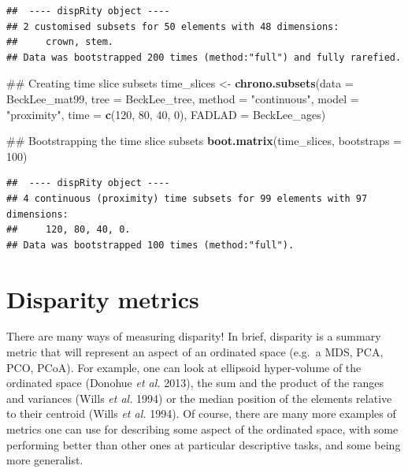 \documentclass[]{book}
\newenvironment{Shaded}{\begin{snugshade}}{\end{snugshade}}
\newcommand{\KeywordTok}[1]{\textcolor[rgb]{0.13,0.29,0.53}{\textbf{#1}}}
\newcommand{\DataTypeTok}[1]{\textcolor[rgb]{0.13,0.29,0.53}{#1}}
\newcommand{\DecValTok}[1]{\textcolor[rgb]{0.00,0.00,0.81}{#1}}
\newcommand{\StringTok}[1]{\textcolor[rgb]{0.31,0.60,0.02}{#1}}
\newcommand{\NormalTok}[1]{#1}
\theoremstyle{definition}
\theoremstyle{definition}
\theoremstyle{remark}
\begin{document}
\begin{verbatim}
##  ---- dispRity object ---- 
## 2 customised subsets for 50 elements with 48 dimensions:
##     crown, stem.
## Data was bootstrapped 200 times (method:"full") and fully rarefied.
\end{verbatim}

\begin{Shaded}
\begin{Highlighting}[]
\NormalTok{## Creating time slice subsets}
\NormalTok{time_slices <-}\StringTok{ }\KeywordTok{chrono.subsets}\NormalTok{(}\DataTypeTok{data =}\NormalTok{ BeckLee_mat99, }\DataTypeTok{tree =}\NormalTok{ BeckLee_tree, }
                               \DataTypeTok{method =} \StringTok{"continuous"}\NormalTok{, }\DataTypeTok{model =} \StringTok{"proximity"}\NormalTok{, }
                               \DataTypeTok{time =} \KeywordTok{c}\NormalTok{(}\DecValTok{120}\NormalTok{, }\DecValTok{80}\NormalTok{, }\DecValTok{40}\NormalTok{, }\DecValTok{0}\NormalTok{),}
                               \DataTypeTok{FADLAD =}\NormalTok{ BeckLee_ages)}

\NormalTok{## Bootstrapping the time slice subsets}
\KeywordTok{boot.matrix}\NormalTok{(time_slices, }\DataTypeTok{bootstraps =} \DecValTok{100}\NormalTok{)}
\end{Highlighting}
\end{Shaded}

\begin{verbatim}
##  ---- dispRity object ---- 
## 4 continuous (proximity) time subsets for 99 elements with 97 dimensions:
##     120, 80, 40, 0.
## Data was bootstrapped 100 times (method:"full").
\end{verbatim}

\hypertarget{disparity-metrics}{\section{Disparity
metrics}\label{disparity-metrics}}

There are many ways of measuring disparity! In brief, disparity is a
summary metric that will represent an aspect of an ordinated space
(e.g.~a MDS, PCA, PCO, PCoA). For example, one can look at ellipsoid
hyper-volume of the ordinated space (Donohue \emph{et al.} 2013), the
sum and the product of the ranges and variances (Wills \emph{et al.}
1994) or the median position of the elements relative to their centroid
(Wills \emph{et al.} 1994). Of course, there are many more examples of
metrics one can use for describing some aspect of the ordinated space,
with some performing better than other ones at particular descriptive
tasks, and some being more generalist.
\end{document}
